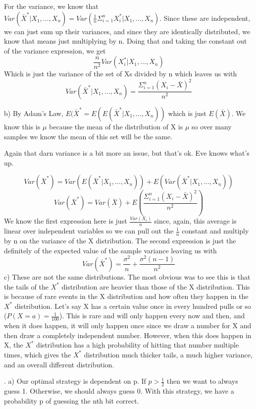 \documentclass[11pt]{article}
\begin{document}
    For the variance, we know that $Var(\bar{X}^* | X_1,\dots,X_n) = Var(\frac{1}{n}\Sigma_{i=1}^nX^*_i | X_1,\dots,X_n)$. Since these are independent, we can just sum up their variances, and since they are identically distributed, we know that means just multiplying by n.  Doing that and taking the constant out of the variance expression, we get
    $$ \frac{n}{n^2}Var(X^*_i | X_1,\dots,X_n)$$
    Which is just the variance of the set of Xs divided by n which leaves us with  
    $$ \boxed{Var(\bar{X}^* | X_1,\dots,X_n) = \frac{\Sigma^n_{i=1}(X_i-\bar{X})^2}{n^2}}$$ 
\smallskip

    b) By Adam's Law, $E(\bar{X}^* = E(E(\bar{X}^* | X_1,\dots,X_n))$ which is just $E(\bar{X})$.  We know this is $\boxed{\mu}$ because the mean of the distribution of X is $\mu$ so over many samples we know the mean of this set will be the same.  

    Again that darn variance is a bit more an issue, but that's ok.  Eve knows what's up.

    $$Var(\bar{X}^*) = Var(E(\bar{X}^* | X_1,\dots,X_n)) + E(Var(\bar{X}^* | X_1,\dots,X_n))$$
    $$Var(\bar{X}^*) = Var(\bar{X}) + E(\frac{\Sigma^n_{i=1}(X_i-\bar{X})^2}{n^2})$$
    We know the first expression here is just $\frac{Var(X_i)}{n}$ since, again, this average is linear over independent variables so we can pull out the $\frac{1}{n}$ constant and multiply by n on the variance of the X distribution.  The second expression is just the definitely of the expected value of the sample variance leaving us with
    $$\boxed{Var(\bar{X}^*) = \frac{\sigma^2}{n} + \frac{\sigma^2(n-1)}{n^2}}$$
\smallskip
	c) These are not the same distributions.  The most obvious was to see this is that the tails of the $X^*$ distribution are heavier than those of the X distribution.  This is because of rare events in the X distribution and how often they happen in the $X^*$ distribution.  Let's say X has a certain value once in every hundred pulls or so ($P(X=a) = \frac{1}{100}$). This is rare and will only happen every now and then, and when it does happen, it will only happen once since we draw a number for X and then draw a completely independent number.  However, when this does happen in X, the $X^*$ distribution has a high probability of hitting that number multiple times, which gives the $X^*$ distribution much thicker tails, a much higher variance, and an overall different distribution. 

\bigskip

.
	a) Our optimal strategy is dependent on p.  If $p>\frac{1}{2}$ then we want to always guess 1.  Otherwise, we should always guess 0.  With this strategy, we have a probability p of guessing the nth bit correct. 
\smallskip
\end{document}
